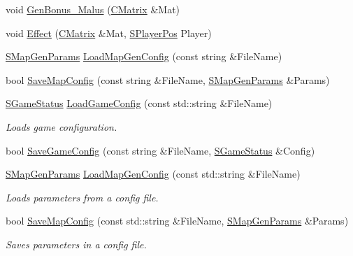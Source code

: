 \begin{DoxyCompactItemize}
\item 
void \hyperlink{namespace_chase_game_a831cfcb5623ab30034f57cbfff28c720}{Gen\-Bonus\-\_\-\-Malus} (\hyperlink{namespace_chase_game_a469449f9237e59efce3982127366c550}{C\-Matrix} \&Mat)
\item 
void \hyperlink{namespace_chase_game_a0e3e15bf28c7e96d0ba0bd14094ba71f}{Effect} (\hyperlink{namespace_chase_game_a469449f9237e59efce3982127366c550}{C\-Matrix} \&Mat, \hyperlink{struct_chase_game_1_1_s_player_pos}{S\-Player\-Pos} Player)
\item 
\hyperlink{struct_chase_game_1_1_s_map_gen_params}{S\-Map\-Gen\-Params} \hyperlink{namespace_chase_game_a4779af792d3de8e274049bf2019e0343}{Load\-Map\-Gen\-Config} (const string \&File\-Name)
\item 
bool \hyperlink{namespace_chase_game_a98e8d90127c802c1445266e39966c3fb}{Save\-Map\-Config} (const string \&File\-Name, \hyperlink{struct_chase_game_1_1_s_map_gen_params}{S\-Map\-Gen\-Params} \&Params)
\item 
\hyperlink{struct_chase_game_1_1_s_game_status}{S\-Game\-Status} \hyperlink{namespace_chase_game_addd460052ec5a5fe3010665ca84b07ec}{Load\-Game\-Config} (const std\-::string \&File\-Name)
\begin{DoxyCompactList}\small\item\em Loads game configuration. \end{DoxyCompactList}\item 
bool \hyperlink{namespace_chase_game_a39f8b039151b1a3eef82fdc1c6f52091}{Save\-Game\-Config} (const string \&File\-Name, \hyperlink{struct_chase_game_1_1_s_game_status}{S\-Game\-Status} \&Config)
\item 
\hyperlink{struct_chase_game_1_1_s_map_gen_params}{S\-Map\-Gen\-Params} \hyperlink{namespace_chase_game_a9c5b5d91cb4251cae461faa4ace8a0cf}{Load\-Map\-Gen\-Config} (const std\-::string \&File\-Name)
\begin{DoxyCompactList}\small\item\em Loads parameters from a config file. \end{DoxyCompactList}\item 
bool \hyperlink{namespace_chase_game_a4c62f61c6aac5bf06292aa51294fd211}{Save\-Map\-Config} (const std\-::string \&File\-Name, \hyperlink{struct_chase_game_1_1_s_map_gen_params}{S\-Map\-Gen\-Params} \&Params)
\begin{DoxyCompactList}\small\item\em Saves parameters in a config file. \end{DoxyCompactList}\item 

\end{DoxyCompactItemize}
